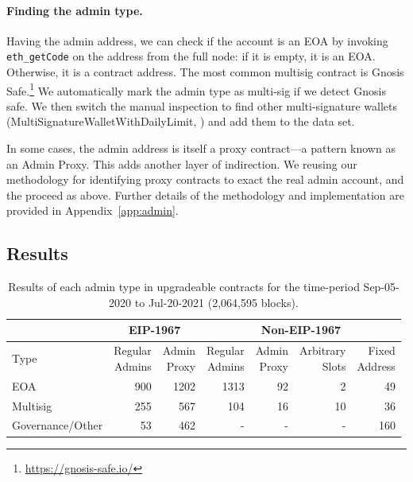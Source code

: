\paragraph{Finding the admin type.} Having the admin address, we can check if the account is an EOA by invoking \texttt{eth\_getCode} on the address from the full node: if it is empty, it is an EOA. Otherwise, it is a contract address. The most common multisig contract is Gnosis Safe.\footnote{\url{https://gnosis-safe.io/}} We automatically mark the admin type as multi-sig if we detect Gnosis safe. We then switch the manual inspection to find other multi-signature wallets (\eg MultiSignatureWalletWithDailyLimit, \etc) and add them to the data set. 

In some cases, the admin address is itself a proxy contract---a pattern known as an Admin Proxy. This adds another layer of indirection. We reusing our methodology for identifying proxy contracts to exact the real admin account, and the proceed as above. Further details of the methodology and implementation are provided in Appendix~\ref{app:admin}.

\subsection{Results}

\begin{table}[t]
\centering
\begin{tabular}{|l|r|r|r|r|r|r|}
\hline      &\multicolumn{2}{c|}{EIP-1967} & \multicolumn{4}{c|}{Non-EIP-1967}         \\
\hline
Type 				& \makecell{Regular\\Admins} & \makecell{Admin\\Proxy} 	& \makecell{Regular\\Admins} 	& \makecell{Admin\\Proxy} & \makecell{Arbitrary\\Slots} &  \makecell{Fixed\\Address}  \\ \hline 
EOA 				& 900  	& 1202		& 1313		& 92			& 2		& 49 		\\ 
Multisig 			& 255  	& 567		& 104		& 16			& 10		& 36		\\ 
Governance/Other 	& 53  	& 462		& -			& -			& -		& 160 	\\ \hline
\end{tabular}
\caption{\label{tab:admindata} Results of each admin type in upgradeable contracts for the time-period {Sep-05-2020} to {Jul-20-2021} (2,064,595 blocks).}
\vspace{-10pt}
\end{table}

